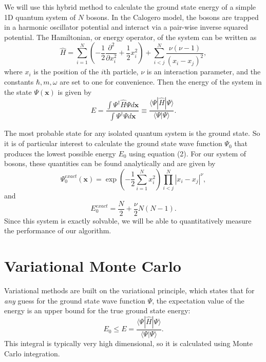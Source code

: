 \documentclass[prb,aps,twocolumn,showpacs,10pt]{revtex4-1}
\begin{document}
We will use this hybrid method to calculate the ground state energy of a simple 1D quantum system of $N$ bosons. In the Calogero model, the bosons are trapped in a harmonic oscillator potential and interact via a pair-wise inverse squared potential. The Hamiltonian, or energy operator, of the system can be written as
\begin{equation}
\hat{H} = \sum_{i=1}^N \left( - \frac{1}{2}\frac{\partial^2}{\partial x_i^2} + \frac{1}{2} x_i^2 \right) + \sum_{i < j}^N \frac{\nu (\nu-1)}{(x_i-x_j)^2},
\end{equation}
where $x_i$ is the position of the $i$th particle, $\nu$ is an interaction parameter, and the constants $\hbar, m, \omega$ are set to one for convenience. Then the energy of the system in the state $\Psi(\bm{x})$ is given by
\begin{equation}
E = \frac{\int \Psi^\dag \hat{H} \Psi d \bm{x} }{\int \Psi^\dag \Psi d \bm{x} }\equiv \frac{\langle \Psi | \hat{H} | \Psi \rangle}{\langle \Psi |  \Psi \rangle}.
\end{equation}

The most probable state for any isolated quantum system is the ground state. So it is of particular interest to calculate the ground state wave function $\Psi_0$ that produces the lowest possible energy $E_0$ using equation (2). For our system of bosons, these quantities can be found analytically and are given by
\begin{equation}
\Psi_0^{exact} (\bm{x}) = \exp \left( -\frac{1}{2}\sum_{i=1}^N x_i^2 \right) \prod_{i<j}^N | x_i-x_j |^\nu,
\end{equation}
and
\begin{equation}
E_0^{exact} = \frac{N}{2} + \frac{\nu}{2}N(N-1).
\end{equation}
Since this system is exactly solvable, we will be able to quantitatively measure the performance of our algorithm. 


\section{Variational Monte Carlo}

Variational methods are built on the variational principle, which states that for \textit{any} guess for the ground state wave function $\Psi$, the expectation value of the energy is an upper bound for the true ground state energy:
\begin{equation}
E_0 \leq E = \frac{\langle \Psi | \hat{H} | \Psi \rangle}{\langle \Psi |  \Psi \rangle}.
\end{equation}
This integral is typically very high dimensional, so it is calculated using Monte Carlo integration.  
\end{document}
